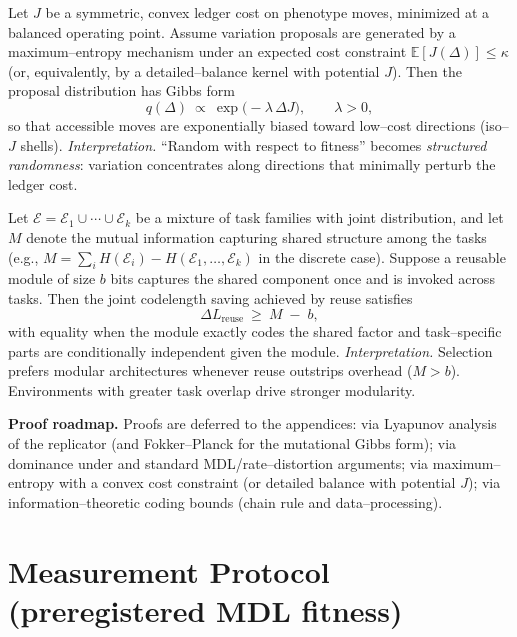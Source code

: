 \documentclass[11pt,a4paper]{article}
\newcommand{\E}{\mathbb{E}}
\begin{document}
\begin{theorem}\label{thm:anisotropy}
Let $J$ be a symmetric, convex ledger cost on phenotype moves, minimized at a balanced operating point. Assume variation proposals are generated by a maximum–entropy mechanism under an expected cost constraint $\E[J(\Delta)]\le \kappa$ (or, equivalently, by a detailed–balance kernel with potential $J$). Then the proposal distribution has Gibbs form
\[
q(\Delta)\ \propto\ \exp\!\big(-\lambda\,\Delta J\big),\qquad \lambda>0,
\]
so that accessible moves are exponentially biased toward low–cost directions (iso–$J$ shells).
\emph{Interpretation.} ``Random with respect to fitness'' becomes \emph{structured randomness}: variation concentrates along directions that minimally perturb the ledger cost.
\end{theorem}

\begin{theorem}\label{thm:modularity}
Let $\mathcal{E}=\mathcal{E}_1\cup\cdots\cup\mathcal{E}_k$ be a mixture of task families with joint distribution, and let $M$ denote the mutual information capturing shared structure among the tasks (e.g., $M=\sum_i H(\mathcal{E}_i)-H(\mathcal{E}_1,\dots,\mathcal{E}_k)$ in the discrete case). Suppose a reusable module of size $b$ bits captures the shared component once and is invoked across tasks. Then the joint codelength saving achieved by reuse satisfies
\[
\Delta L_{\text{reuse}}\ \ge\ M\;-\;b,
\]
with equality when the module exactly codes the shared factor and task–specific parts are conditionally independent given the module.
\emph{Interpretation.} Selection prefers modular architectures whenever reuse outstrips overhead ($M>b$). Environments with greater task overlap drive stronger modularity.
\end{theorem}

\noindent\textbf{Proof roadmap.} Proofs are deferred to the appendices:  via Lyapunov analysis of the replicator (and Fokker–Planck for the mutational Gibbs form);  via dominance under  and standard MDL/rate–distortion arguments;  via maximum–entropy with a convex cost constraint (or detailed balance with potential $J$);  via information–theoretic coding bounds (chain rule and data–processing).

\section{Measurement Protocol (preregistered MDL fitness)}
\end{document}
